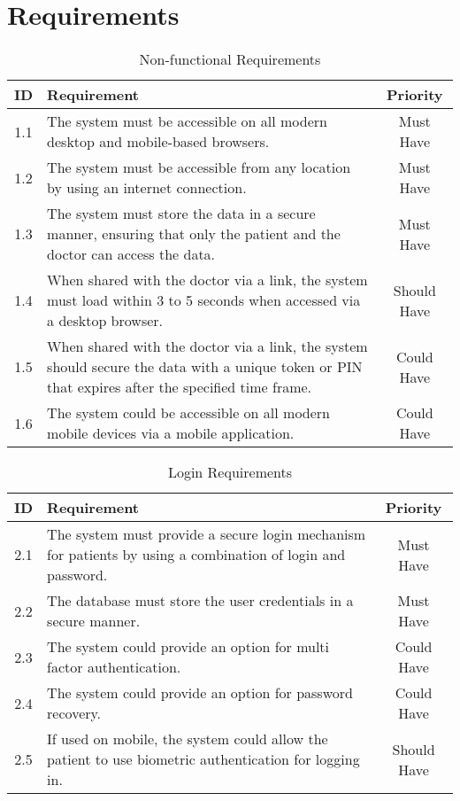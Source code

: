 \appendix

\chapter{Requirements}\label{sec:requirements}


\begin{table}[h!]
    \centering
    \begin{tabular}{|c|p{10cm}|c|}
    \hline
    \textbf{ID}  & \textbf{Requirement}  & \textbf{Priority} \\ \hline
    1.1  & The system must be accessible on all modern desktop and mobile-based browsers.       & Must Have \\ \hline
    1.2  & The system must be accessible from any location by using an internet connection.     & Must Have \\ \hline
    1.3  & The system must store the data in a secure manner, ensuring that only the patient and the doctor can access the data. & Must Have \\ \hline
    1.4  & When shared with the doctor via a link, the system must load within 3 to 5 seconds when accessed via a desktop browser. & Should Have \\ \hline
    1.5  & When shared with the doctor via a link, the system should secure the data with a unique token or PIN that expires after the specified time frame. & Could Have \\ \hline
    1.6  & The system could be accessible on all modern mobile devices via a mobile application. & Could Have \\ \hline
    \end{tabular}
    \caption{Non-functional Requirements}
\end{table}
    
\begin{table}[h!]
    \centering
    \begin{tabular}{|c|p{10cm}|c|}
    \hline
    \textbf{ID}  & \textbf{Requirement}  & \textbf{Priority} \\ \hline
    2.1  & The system must provide a secure login mechanism for patients by using a combination of login and password. & Must Have \\ \hline
    2.2 & The database must store the user credentials in a secure manner. & Must Have \\ \hline
    2.3 & The system could provide an option for multi factor authentication. & Could Have \\ \hline
    2.4 & The system could provide an option for password recovery. & Could Have \\ \hline
    2.5  & If used on mobile, the system could allow the patient to use biometric authentication for logging in. & Should Have \\ \hline
    \end{tabular}
    \caption{Login Requirements}
\end{table}

